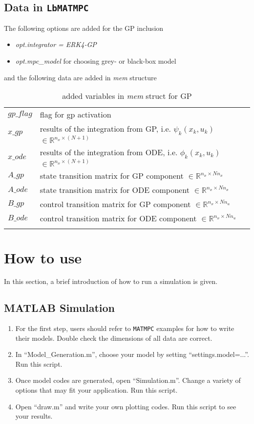 \documentclass{article}
\newcommand{\software}[1]{{\tt#1}}
\newcommand{\alert}[1]{{\textit{#1}}}
\begin{document}
\subsection{Data in \software{LbMATMPC}}
The following options are added for the GP inclusion
\begin{itemize}
    \item \textit{opt.integrator = ERK4-GP}
    \item \textit{opt.mpc\_model} for choosing grey- or black-box model
\end{itemize}
and the following data are added in \alert{mem} structure
\begin{longtable}{l|l}
	\hline
	$gp\_flag$ & flag for gp activation   \\
	$x\_gp$ & results of the integration from GP, i.e. $\psi_k(x_k,u_k)$ $\in\mathbb{R}^{n_x\times (N+1)}$ \\
	$x\_ode$ & results of the integration from ODE, i.e. $\phi_k(x_k,u_k)$ $\in\mathbb{R}^{n_x\times (N+1)}$ \\
	$A\_gp$ & state transition matrix for GP component $\in\mathbb{R}^{n_x\times N n_x}$ \\
	$A\_ode$ & state transition matrix for ODE component $\in\mathbb{R}^{n_x\times N n_x}$ \\
	$B\_gp$ & control transition matrix for GP component $\in\mathbb{R}^{n_x\times N n_u}$ \\
	$B\_ode$ & control transition matrix for ODE component $\in\mathbb{R}^{n_x\times N n_u}$ \\
	\hline
	\caption{added variables in \alert{mem} struct for GP}
	\label{table:mem-GP}
\end{longtable}


\section{How to use}
In this section, a brief introduction of how to run a simulation is given.

\subsection{MATLAB Simulation}
\begin{enumerate}
	\item For the first step, users should refer to \software{MATMPC} examples for how to write their models. Double check the dimensions of all data are correct.
	\item In ``Model\_Generation.m'', choose your model by setting ``settings.model=...''. Run this script.
	\item Once model codes are generated, open ``Simulation.m''. Change a variety of options that may fit your application. Run this script.
	\item Open ``draw.m'' and write your own plotting codes. Run this script to see your results.
\end{enumerate}
\end{document}
